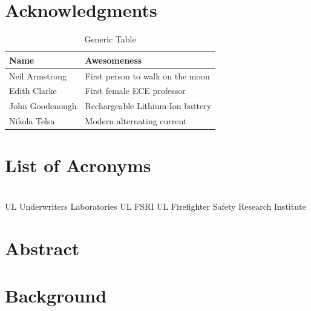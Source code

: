 \documentclass[12pt,oneside]{book}
\begin{document}
\newpage

\chapter*{\centering Acknowledgments}

\begin{table}[!ht]
	\centering
	\caption*{Generic Table}
	\begin{tabular}{ll}
		\toprule[1.5pt]
		Name & Awesomeness \\ 
		\midrule
		Neil Armstrong		 & First person to walk on the moon \\
		Edith Clarke		 & First female ECE professor \\
		John Goodenough		 & Rechargeable Lithium-Ion battery \\
		Nikola Telsa		 & Modern alternating current \\  
		\bottomrule[1.25pt]
	\end{tabular}
\end{table}


\cleardoublepage
{}
{}
\tableofcontents

\cleardoublepage
{}
{}
\listoffigures

\cleardoublepage
{}
{}
\listoftables

\chapter{List of Acronyms}

\begin{tabbing}
\hspace{1.5in} \= \\
UL 	    \> Underwriters Laboratories 
UL FSRI \> UL Firefighter Safety Research Institute \\
\end{tabbing}

\newpage

\mainmatter

\chapter*{\centering Abstract}

\newpage

\chapter{Background}
\end{document}
